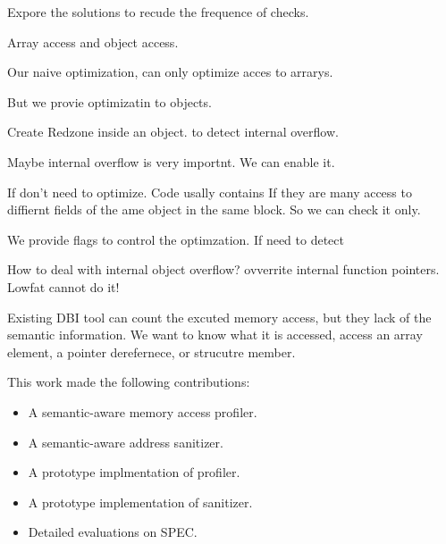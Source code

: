 Expore the solutions to recude the frequence of checks.

Array access and object access.

Our naive optimization, can only optimize acces to arrarys.

But we provie optimizatin to objects.

Create Redzone inside an object. to detect internal overflow.

Maybe internal overflow is very importnt.
We can enable it.



If don't need to optimize.
Code usally contains If they are many access to diffiernt fields of the ame object in the same block.
So we can check it only.


We provide flags to control the optimzation.
If need to detect

How to deal with internal object overflow? ovverrite internal function pointers.
Lowfat cannot do it!


Existing DBI tool can count the excuted memory access, but they lack of the semantic information.
We want to know what it is accessed, access an array element, a pointer derefernece, or strucutre member.


This work made the following contributions:

\begin{itemize}
    \item A semantic-aware memory access profiler.
    \item A semantic-aware address sanitizer.
    \item A prototype implmentation of profiler.
    \item A prototype implementation of sanitizer.
    \item Detailed evaluations on SPEC.
\end{itemize}




